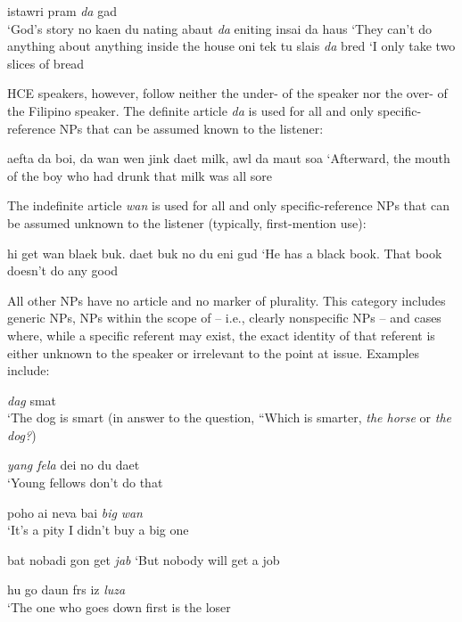 \ea\label{ex:31}
 istawri pram \textit{da} gad\\
\glt   `God's story
\z
\ea\label{ex:32}
 no kaen du nating abaut \textit{da} eniting insai da haus
\glt   `They can't do anything about anything inside the house
\z
\ea\label{ex:33}
 oni tek tu slais \textit{da} bred
\glt `I only take two slices of bread
\z

HCE speakers, however, follow neither the under- of the  speaker nor the over- of the Filipino speaker. The definite article \textit{da} is used for all and only specific-refer\-ence NPs that can be assumed known to the listener:

\ea\label{ex:34}
 aefta da boi, da wan wen jink daet milk, awl da maut soa 
\glt `Afterward, the mouth of the boy who had drunk that milk was all sore
\z

\noindent The indefinite article \textit{wan} is used for all and only specific-reference NPs that can be assumed unknown to the listener (typically, first-mention use):

\ea\label{ex:35}
 hi get wan blaek buk. daet buk no du eni gud
\glt `He has a black book. That book doesn't do any good
\z

\noindent All other NPs have no article and no marker of plurality. This category includes generic NPs, NPs within the scope of  -- i.e., clearly nonspecific NPs -- and cases where, while a specific referent may exist, the exact identity of that referent is either unknown to the speaker or irrelevant to the point at issue. Examples include:

\ea\label{ex:36}
\textit{dag} smat\\
\glt `The dog is smart (in answer to the question, ``Which is smarter, \textit{the horse} or \textit{the dog?})
\z

\ea\label{ex:37}
\textit{yang fela} dei no du daet \\
\glt `Young fellows don't do that
\z


\ea\label{ex:38}
poho ai neva bai \textit{big} \textit{wan}\\
\glt `It's a pity I didn't buy a big one
\z

\ea\label{ex:39}
bat nobadi gon get \textit{jab}
\glt `But nobody will get a job
\z

\ea\label{ex:40}
hu go daun frs iz \textit{luza}\\
\glt `The one who goes down first is the loser
\z

